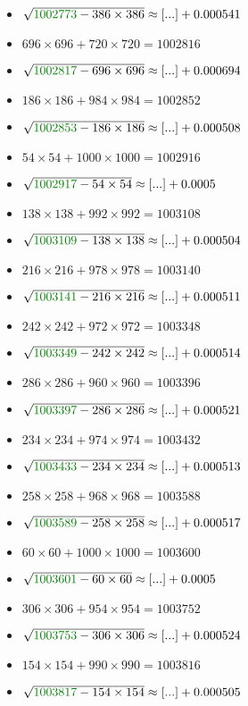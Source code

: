 \documentclass[12pt]{article}
\begin{document}
\begin{multicols}{2}
\begin{itemize}
\item $\sqrt{ {\color{green!50!black}{1002773}} - 386\times 386 } \approx [...] + 0.000541$
\item $696×696 + 720×720 = 1002816$
\item $\sqrt{ {\color{green!50!black}{1002817}} - 696\times 696 } \approx [...] + 0.000694$
\item $186×186 + 984×984 = 1002852$
\item $\sqrt{ {\color{green!50!black}{1002853}} - 186\times 186 } \approx [...] + 0.000508$
\item $54×54 + 1000×1000 = 1002916$
\item $\sqrt{ {\color{green!50!black}{1002917}} - 54\times 54 } \approx [...] + 0.0005$
\item $138×138 + 992×992 = 1003108$
\item $\sqrt{ {\color{green!50!black}{1003109}} - 138\times 138 } \approx [...] + 0.000504$
\item $216×216 + 978×978 = 1003140$
\item $\sqrt{ {\color{green!50!black}{1003141}} - 216\times 216 } \approx [...] + 0.000511$
\item $242×242 + 972×972 = 1003348$
\item $\sqrt{ {\color{green!50!black}{1003349}} - 242\times 242 } \approx [...] + 0.000514$
\item $286×286 + 960×960 = 1003396$
\item $\sqrt{ {\color{green!50!black}{1003397}} - 286\times 286 } \approx [...] + 0.000521$
\item $234×234 + 974×974 = 1003432$
\item $\sqrt{ {\color{green!50!black}{1003433}} - 234\times 234 } \approx [...] + 0.000513$
\item $258×258 + 968×968 = 1003588$
\item $\sqrt{ {\color{green!50!black}{1003589}} - 258\times 258 } \approx [...] + 0.000517$
\item $60×60 + 1000×1000 = 1003600$
\item $\sqrt{ {\color{green!50!black}{1003601}} - 60\times 60 } \approx [...] + 0.0005$
\item $306×306 + 954×954 = 1003752$
\item $\sqrt{ {\color{green!50!black}{1003753}} - 306\times 306 } \approx [...] + 0.000524$
\item $154×154 + 990×990 = 1003816$
\item $\sqrt{ {\color{green!50!black}{1003817}} - 154\times 154 } \approx [...] + 0.000505$

\end{itemize}
\end{multicols}
\end{document}
